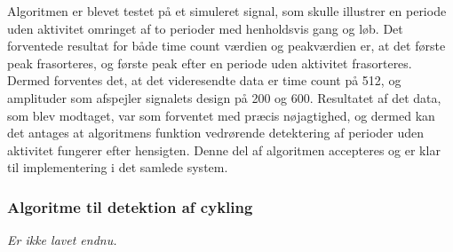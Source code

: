 Algoritmen er blevet testet på et simuleret signal, som skulle illustrer en periode uden aktivitet omringet af to perioder med henholdsvis gang og løb. Det forventede resultat for både time count værdien og peakværdien er, at det første peak frasorteres, og første peak efter en periode uden aktivitet frasorteres. Dermed forventes det, at det videresendte data er time count på 512, og amplituder som afspejler signalets design på 200 og 600. Resultatet af det data, som blev modtaget, var som forventet med præcis nøjagtighed, og dermed kan det antages at algoritmens funktion vedrørende detektering af perioder uden aktivitet fungerer efter hensigten. Denne del af algoritmen accepteres og er klar til implementering i det samlede system.

\subsubsection{Algoritme til detektion af cykling}
\textit{Er ikke lavet endnu.}

